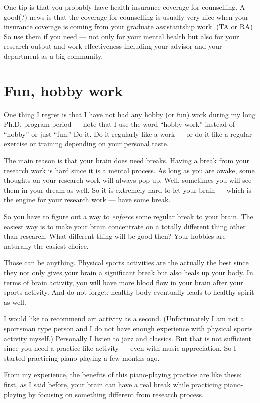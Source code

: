\documentclass[11pt]{article}
\begin{document}
One tip is that you probably have health insurance coverage for
counselling. A good(?) news is that the coverage for counselling is
usually very nice when your insurance coverage is coming from your
graduate assistantship work. (TA or RA) So use them if you need --- not
only for your mental health but also for your research output and work
effectiveness including your advisor and your department as a big community.

\section{Fun, hobby work}

One thing I regret is that I have not had any hobby (or fun) work
during my long Ph.D. program period --- note that I use the word
``hobby work'' instead of ``hobby'' or just ``fun.'' Do it. Do it
regularly like a work --- or do it like a regular exercise or
training depending on your personal taste.

The main reason is that your brain does need breaks. Having a
break from your research work is hard since it is a mental
process. As long as you are awake, some thoughts on your research
work will always pop up. Well, sometimes you will see them in your
dream as well. So it is extremely hard to let your brain --- which
is the engine for your research work --- have some break.

So you have to figure out a way to \emph{enforce} some regular
break to your brain. The easiest way is to make your brain
concentrate on a totally different thing other than research.
What different thing will be good then?  Your hobbies are
naturally the easiest choice. 

Those can be anything. Physical sports activities are the actually
the best since they not only gives your brain a significant break
but also heals up your body. In terms of brain activity, you will
have more blood flow in your brain after your sports activity. And
do not forget: healthy body eventually leads to healthy spirit as
well. 

I would like to recommend art activity as a second. (Unfortunately
I am not a sportsman type person and I do not have enough experience
with physical sports activity myself.) Personally I listen to jazz
and classics. But that is not sufficient since you need a
practice-like activity --- even with music appreciation. So I
started practicing piano playing a few months ago. 

From my experience, the benefits of this piano-playing practice
are like these: first, as I said before, your brain can have a
real break while practicing piano-playing by focusing on something
different from research process.
\end{document}
